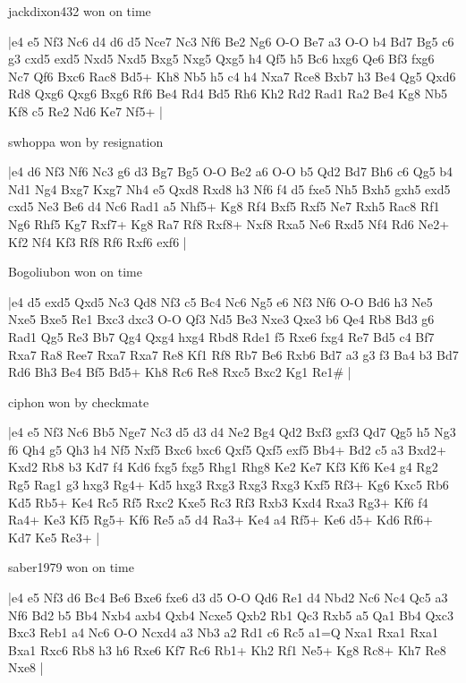 \showboard

jackdixon432 won on time

\makegametitle
|e4 e5 Nf3 Nc6 d4 d6 d5 Nce7 Nc3 Nf6 Be2 Ng6 O-O Be7 a3 O-O b4 Bd7 Bg5 c6 g3 cxd5 exd5 Nxd5 Nxd5 Bxg5 Nxg5 Qxg5 h4 Qf5 h5 Bc6 hxg6 Qe6 Bf3 fxg6 Nc7 Qf6 Bxc6 Rac8 Bd5+ Kh8 Nb5 h5 c4 h4 Nxa7 Rce8 Bxb7 h3 Be4 Qg5 Qxd6 Rd8 Qxg6 Qxg6 Bxg6 Rf6 Be4 Rd4 Bd5 Rh6 Kh2 Rd2 Rad1 Ra2 Be4 Kg8 Nb5 Kf8 c5 Re2 Nd6 Ke7 Nf5+  |

\showboard

swhoppa won by resignation

\makegametitle
|e4 d6 Nf3 Nf6 Nc3 g6 d3 Bg7 Bg5 O-O Be2 a6 O-O b5 Qd2 Bd7 Bh6 c6 Qg5 b4 Nd1 Ng4 Bxg7 Kxg7 Nh4 e5 Qxd8 Rxd8 h3 Nf6 f4 d5 fxe5 Nh5 Bxh5 gxh5 exd5 cxd5 Ne3 Be6 d4 Nc6 Rad1 a5 Nhf5+ Kg8 Rf4 Bxf5 Rxf5 Ne7 Rxh5 Rac8 Rf1 Ng6 Rhf5 Kg7 Rxf7+ Kg8 Ra7 Rf8 Rxf8+ Nxf8 Rxa5 Ne6 Rxd5 Nf4 Rd6 Ne2+ Kf2 Nf4 Kf3 Rf8 Rf6 Rxf6 exf6  |

\showboard

Bogoliubon won on time

\makegametitle
|e4 d5 exd5 Qxd5 Nc3 Qd8 Nf3 c5 Bc4 Nc6 Ng5 e6 Nf3 Nf6 O-O Bd6 h3 Ne5 Nxe5 Bxe5 Re1 Bxc3 dxc3 O-O Qf3 Nd5 Be3 Nxe3 Qxe3 b6 Qe4 Rb8 Bd3 g6 Rad1 Qg5 Re3 Bb7 Qg4 Qxg4 hxg4 Rbd8 Rde1 f5 Rxe6 fxg4 Re7 Bd5 c4 Bf7 Rxa7 Ra8 Ree7 Rxa7 Rxa7 Re8 Kf1 Rf8 Rb7 Be6 Rxb6 Bd7 a3 g3 f3 Ba4 b3 Bd7 Rd6 Bh3 Be4 Bf5 Bd5+ Kh8 Rc6 Re8 Rxc5 Bxc2 Kg1 Re1\#  |

\showboard

ciphon won by checkmate

\makegametitle
|e4 e5 Nf3 Nc6 Bb5 Nge7 Nc3 d5 d3 d4 Ne2 Bg4 Qd2 Bxf3 gxf3 Qd7 Qg5 h5 Ng3 f6 Qh4 g5 Qh3 h4 Nf5 Nxf5 Bxc6 bxc6 Qxf5 Qxf5 exf5 Bb4+ Bd2 c5 a3 Bxd2+ Kxd2 Rb8 b3 Kd7 f4 Kd6 fxg5 fxg5 Rhg1 Rhg8 Ke2 Ke7 Kf3 Kf6 Ke4 g4 Rg2 Rg5 Rag1 g3 hxg3 Rg4+ Kd5 hxg3 Rxg3 Rxg3 Rxg3 Kxf5 Rf3+ Kg6 Kxc5 Rb6 Kd5 Rb5+ Ke4 Rc5 Rf5 Rxc2 Kxe5 Rc3 Rf3 Rxb3 Kxd4 Rxa3 Rg3+ Kf6 f4 Ra4+ Ke3 Kf5 Rg5+ Kf6 Re5 a5 d4 Ra3+ Ke4 a4 Rf5+ Ke6 d5+ Kd6 Rf6+ Kd7 Ke5 Re3+  |

\showboard

saber1979 won on time

\makegametitle
|e4 e5 Nf3 d6 Bc4 Be6 Bxe6 fxe6 d3 d5 O-O Qd6 Re1 d4 Nbd2 Nc6 Nc4 Qc5 a3 Nf6 Bd2 b5 Bb4 Nxb4 axb4 Qxb4 Ncxe5 Qxb2 Rb1 Qc3 Rxb5 a5 Qa1 Bb4 Qxc3 Bxc3 Reb1 a4 Nc6 O-O Ncxd4 a3 Nb3 a2 Rd1 c6 Rc5 a1=Q Nxa1 Rxa1 Rxa1 Bxa1 Rxc6 Rb8 h3 h6 Rxe6 Kf7 Rc6 Rb1+ Kh2 Rf1 Ne5+ Kg8 Rc8+ Kh7 Re8 Nxe8  |

